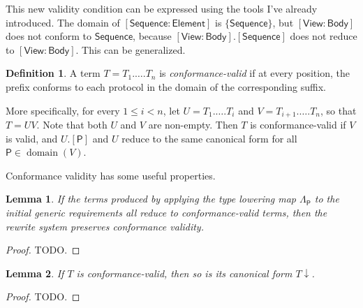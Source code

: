 \documentclass[headsepline,bibliography=totoc]{scrreport}
\newcommand{\namesym}[1]{\mathsf{#1}}
\newcommand{\proto}[1]{\bm{\mathsf{#1}}}
\newcommand{\protosym}[1]{[\proto{#1}]}
\newcommand{\assocsym}[2]{[\proto{#1}\colon\namesym{#2}]}
\DeclareMathOperator{\domain}{domain}
\newtheorem{lemma}{Lemma}[chapter]
\theoremstyle{definition}
\theoremstyle{definition}
\newtheorem{definition}{Definition}[chapter]
\theoremstyle{definition}
\begin{document}
This new validity condition can be expressed using the tools I've already introduced. The domain of $\assocsym{Sequence}{Element}$ is $\{\proto{Sequence}\}$, but $\assocsym{View}{Body}$ does not conform to $\proto{Sequence}$, because $\assocsym{View}{Body}.\protosym{Sequence}$ does not reduce to $\assocsym{View}{Body}$. This can be generalized.
\begin{definition} A term $T=T_1.\ldots.T_n$ is \emph{conformance-valid} if at every position, the prefix conforms to each protocol in the domain of the corresponding suffix.

More specifically, for every $1\leq i<n$, let $U=T_1.\ldots.T_i$ and $V=T_{i+1}.\ldots.T_n$, so that $T=UV$. Note that both $U$ and $V$ are non-empty. Then $T$ is conformance-valid if $V$ is valid, and $U.\protosym{P}$ and $U$ reduce to the same canonical form for all $\proto{P}\in\domain(V)$.
\end{definition}
Conformance validity has some useful properties.
\begin{lemma} If the terms produced by applying the type lowering map $\Lambda_{\proto{P}}$ to the initial generic requirements all reduce to conformance-valid terms, then the rewrite system preserves conformance validity.
\end{lemma}
\begin{proof} TODO.
\end{proof}

\begin{lemma} If $T$ is conformance-valid, then so is its canonical form ${T}{\downarrow}$.
\end{lemma}
\begin{proof} TODO.
\end{proof}

\iffalse
This solves the quandary presented at the beginning of this chapter, where the earlier formulation of the rewrite system that lacked associated type symbols had no apparent way of implementing the \texttt{getCanonicalTypeInContext()} generic signature query.

Now that a term containing name symbols reduces to a canonical term with associated type symbols, it appears that mapping terms back to fully resolved type parameters is now a possibility. Unfortunately, the reality is a little bit more complicated. The inherited associated type construction I will introduce in the next section once again breaks the correspondence between terms and canonical types; this will be repaired in Section \ref{implqueries}.
\fi
\end{document}
